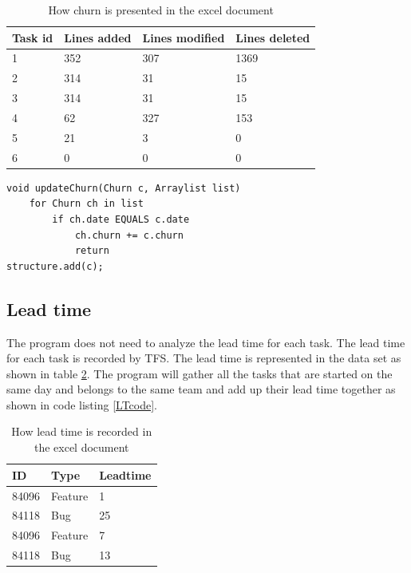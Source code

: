 \documentclass[UKenglish]{ifimaster}  %
\begin{document}
\begin{table}[!ht]
\begin{center}
    \begin{tabular}{| l | l | l | l |}
    \hline
    Task id & Lines added & Lines modified  & Lines deleted \\ \hline
1&352&307&1369\\ \hline
2&314 & 31 & 15 \\ \hline
3&314&31 & 15\\ \hline
4&62&327&153 \\ \hline
5&21&3&0 \\ \hline
6&0&0&0 \\ \hline
\end{tabular}
\caption{How churn is presented in the excel document}
\label{table:churn} %
\end{center}
\end{table}

\begin{minipage}{\textwidth}
\begin{lstlisting}[caption=Pseudocode example of how throughput is measured, label=churnCode]
void updateChurn(Churn c, Arraylist list)
	for Churn ch in list
		if ch.date EQUALS c.date
			ch.churn += c.churn
			return
structure.add(c);
\end{lstlisting}
 \end{minipage}
 


\subsection{Lead time}
\label{sec:LT}
The program does not need to analyze  the lead time for each task. The lead time for each task is recorded by TFS. The lead time is represented in the data set as shown in table \ref{table:LT}. The program will gather all the tasks that are started on the same day and belongs to the same team and add up their lead time together as shown in code listing \ref{LTcode}.   
\begin{table}[!ht]
\begin{center}
\begin{tabular}{ | l | l | l | }
\hline
	ID & Type & Leadtime \\ \hline
	84096 &  Feature  & 1 \\ \hline
	84118 &  Bug  & 25 \\ \hline
	84096 &  Feature  & 7 \\ \hline
	84118 &  Bug  & 13 \\ \hline
\end{tabular}
\caption{How lead time is recorded in the excel document}
\label{table:LT} %
\end{center}
\end{table}
\end{document}
